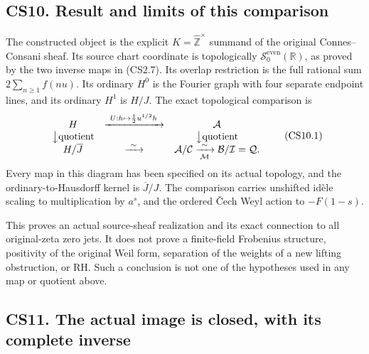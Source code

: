 \subsection{CS10. Result and limits of this
comparison}\label{cs10.-result-and-limits-of-this-comparison}

The constructed object is the explicit
\(K=\widehat{\mathbb Z}^{\times}\) summand of the original
Connes--Consani sheaf. Its source chart coordinate is topologically
\(\mathcal S_0^{\mathrm{even}}(\mathbb R)\), as proved by the two
inverse maps in (CS2.7). Its overlap restriction is the full rational
sum \(2\sum_{n\ge1}f(nu)\). Its ordinary \(H^0\) is the Fourier graph
with four separate endpoint lines, and its ordinary \(H^1\) is \(H/J\).
The exact topological comparison is \[
\begin{array}{ccc}
H &\xrightarrow{\ U:h\mapsto\frac12u^{1/2}h\ }&\mathcal A\\
\big\downarrow{\mathrm{quotient}}&&\big\downarrow{\mathrm{quotient}}\\
H/\overline J&\xrightarrow{\ \sim\ }&\mathcal A/\mathcal C
\xrightarrow[\mathcal M]{\ \sim\ }\mathcal B/\mathcal I=\mathcal Q.
\end{array}
\tag{CS10.1}
\] Every map in this diagram has been specified on its actual topology,
and the ordinary-to-Hausdorff kernel is \(\overline J/J\). The
comparison carries unshifted idèle scaling to multiplication by \(a^s\),
and the ordered Čech Weyl action to \(-F(1-s)\).

This proves an actual source-sheaf realization and its exact connection
to all original-zeta zero jets. It does not prove a finite-field
Frobenius structure, positivity of the original Weil form, separation of
the weights of a new lifting obstruction, or RH. Such a conclusion is
not one of the hypotheses used in any map or quotient above.

\subsection{CS11. The actual image is closed, with its complete
inverse}\label{cs11.-the-actual-image-is-closed-with-its-complete-inverse}

